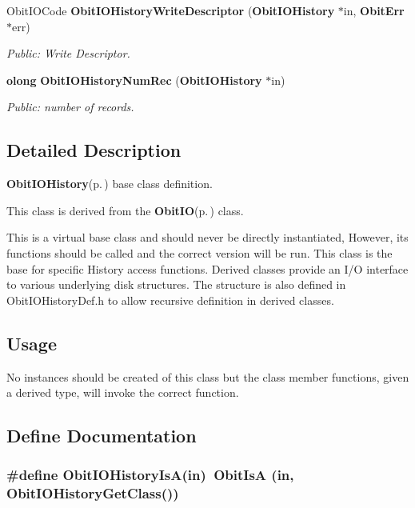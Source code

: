 \begin{CompactItemize}
Obit\-IOCode {\bf Obit\-IOHistory\-Write\-Descriptor} ({\bf Obit\-IOHistory} $\ast$in, {\bf Obit\-Err} $\ast$err)
\begin{CompactList}\small\item\em Public: Write Descriptor. \item\end{CompactList}\item 
{\bf olong} {\bf Obit\-IOHistory\-Num\-Rec} ({\bf Obit\-IOHistory} $\ast$in)
\begin{CompactList}\small\item\em Public: number of records. \item\end{CompactList}\end{CompactItemize}


\subsection{Detailed Description}
{\bf Obit\-IOHistory}{\rm (p.\,\pageref{structObitIOHistory})} base class definition. 

This class is derived from the {\bf Obit\-IO}{\rm (p.\,\pageref{structObitIO})} class.

This is a virtual base class and should never be directly instantiated, However, its functions should be called and the correct version will be run. This class is the base for specific History access functions. Derived classes provide an I/O interface to various underlying disk structures. The structure is also defined in Obit\-IOHistory\-Def.h to allow recursive definition in derived classes.\subsection{Usage}\label{ObitIOHistory_8h_ObitIOHistoryUsage}
No instances should be created of this class but the class member functions, given a derived type, will invoke the correct function.

\subsection{Define Documentation}
\subsubsection{\setlength{\rightskip}{0pt plus 5cm}\#define Obit\-IOHistory\-Is\-A(in)\ Obit\-Is\-A (in, Obit\-IOHistory\-Get\-Class())}\label{ObitIOHistory_8h_a2}


